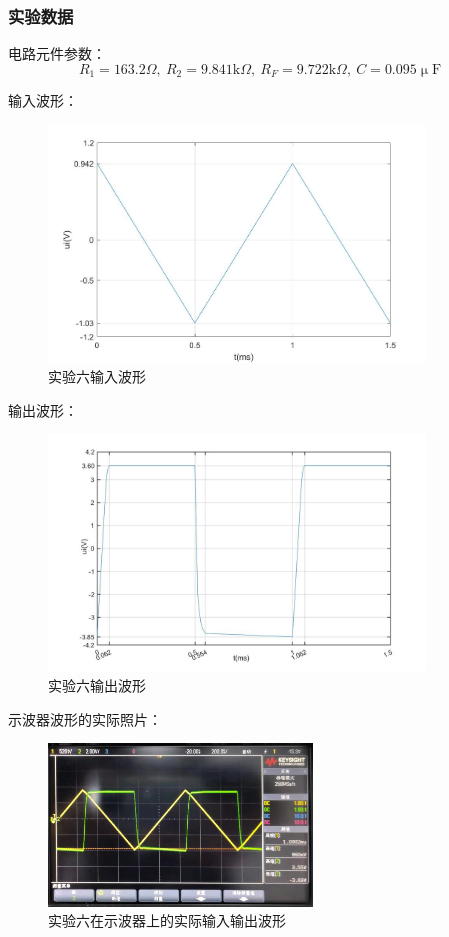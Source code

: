 \documentclass[a4paper,11pt,UTF8]{ctexart}
\newcommand\mr[1]{\mathrm{#1}}
\begin{document}
\subsubsection{实验数据}
电路元件参数：
\[ R_1=163.2\Omega,~R_2=9.841\mr{k}\Omega,~R_F=9.722\mr{k}\Omega,~C=0.095\mr{\upmu F} \]
\par 输入波形：
\begin{figure}[H]
 \centering
 \includegraphics[width=10cm]{Exp06In}
 \caption{实验六输入波形}
 \label{fig:Exp06In}
\end{figure}
输出波形：
\begin{figure}[H]
 \centering
 \includegraphics[width=10cm]{Exp06Out}
 \caption{实验六输出波形}
 \label{fig:Exp06Out}
\end{figure}
示波器波形的实际照片：
\begin{figure}[H]
 \centering
 \includegraphics[width=7cm]{Exp06Real}
 \caption{实验六在示波器上的实际输入输出波形}
 \label{fig:Exp06Real}
\end{figure}
\end{document}
